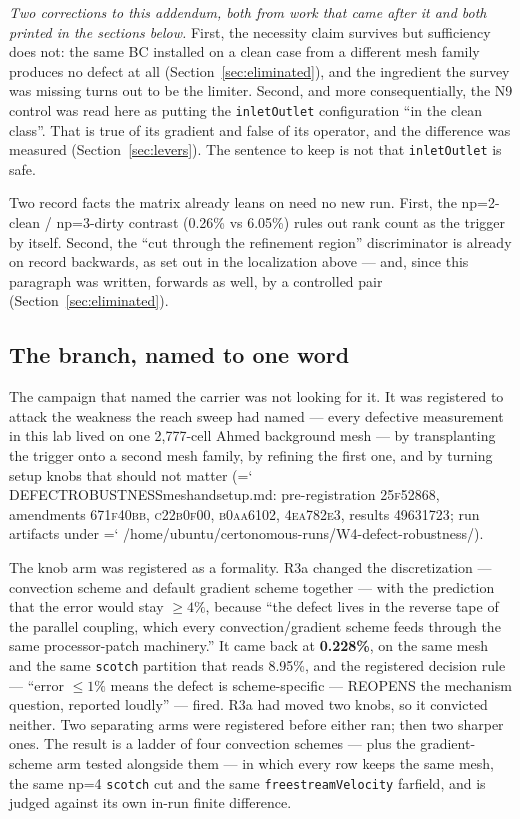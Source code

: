 \documentclass[11pt,a4paper]{article}
\newcommand{\artifact}[1]{{\small\ttfamily\hyphenchar\font=`\-\relax
  \def\_{\textunderscore\allowbreak}#1}}
\newcommand{\commit}[1]{\textsc{\small #1}}
\begin{document}
\emph{Two corrections to this addendum, both from work that came after it and both printed
in the sections below.} First, the necessity claim survives but sufficiency does not: the
same BC installed on a clean case from a different mesh family produces no defect at all
(Section~\ref{sec:eliminated}), and the ingredient the survey was missing turns out to be the
limiter. Second, and more consequentially, the N9 control was read here as putting the
\texttt{inletOutlet} configuration ``in the clean class''. That is true of its gradient and
false of its operator, and the difference was measured
(Section~\ref{sec:levers}). The sentence to keep is not that
\texttt{inletOutlet} is safe.

Two record facts the matrix already leans on need no new run. First, the np=2-clean /
np=3-dirty contrast (0.26\% vs 6.05\%) rules out rank count as the trigger by itself.
Second, the ``cut through the refinement region'' discriminator is already on record
backwards, as set out in the localization above --- and, since this paragraph was written,
forwards as well, by a controlled pair (Section~\ref{sec:eliminated}).

\subsection{The branch, named to one word}
\label{sec:branch}

The campaign that named the carrier was not looking for it. It was registered to attack the
weakness the reach sweep had named --- every defective measurement in this lab lived on one
2{,}777-cell Ahmed background mesh --- by transplanting the trigger onto a second mesh
family, by refining the first one, and by turning setup knobs that should not matter
(\artifact{DEFECT\_ROBUSTNESS\_mesh\_and\_setup.md}: pre-registration \commit{25f52868},
amendments \commit{671f40bb}, \commit{c22b0f00}, \commit{b0aa6102}, \commit{4ea782e3},
results \commit{49631723}; run artifacts under
\artifact{/home/ubuntu/certonomous-runs/W4-defect-robustness/}).

The knob arm was registered as a formality. R3a changed the discretization --- convection
scheme and default gradient scheme together --- with the prediction that the error would stay
\(\ge 4\%\), because ``the defect lives in the reverse tape of the parallel coupling, which
every convection/gradient scheme feeds through the same processor-patch machinery.'' It came
back at \textbf{0.228\%}, on the same mesh and the same \texttt{scotch} partition that reads
8.95\%, and the registered decision rule --- ``error \(\le 1\%\) means the defect is
scheme-specific --- REOPENS the mechanism question, reported loudly'' --- fired. R3a had
moved two knobs, so it convicted neither. Two separating arms were registered before either
ran; then two sharper ones. The result is a ladder of four convection schemes --- plus the
gradient-scheme arm tested alongside them --- in which every row keeps the same mesh, the same
np=4 \texttt{scotch} cut and the same \texttt{freestreamVelocity} farfield, and is judged
against its own in-run finite difference.
\end{document}
